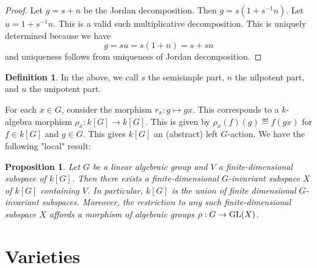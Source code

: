\documentclass[]{pcmi}
\theoremstyle{plain}
\newtheorem{Proposition}[equation]{Proposition}
\theoremstyle{definition}
\newtheorem{Definition}[equation]{Definition}
\begin{document}
\begin{proof}
    Let $g = s + n$ be the Jordan decomposition. Then $g = s(1 + s^{-1}n)$. Let $u = 1 + s^{-1}n$. This is a valid such multiplicative decomposition. This is uniquely determined because we have 
    \[
        g = su = s(1 + n) = s + sn
    \]
    and uniqueness follows from uniqueness of Jordan decomposition. 
\end{proof}

\begin{Definition}
    In the above, we call $s$ the semisimple part, $n$ the nilpotent part, and $u$ the unipotent part. 
\end{Definition}

For each $x \in G$, consider the morphism $r_x : g \mapsto gx$. This corresponds to a $k$-algebra morphism $\rho_x : k[G] \to k[G]$. This is given by $\rho_x(f)(g) \eqdef f(gx)$ for $f \in k[G]$ and $g \in G$. This gives $k[G]$ an (abstract) left $G$-action. We have the following "local" result: 

\begin{Proposition}
    Let $G$ be a linear algebraic group and $V$ a finite-dimensional subspace of $k[G]$. Then there exists a finite-dimensional $G$-invariant subspace $X$ of $k[G]$ containing $V$. In particular, $k[G]$ is the union of finite dimensional $G$-invariant subspaces. Moreover, the restriction to any such finite-dimensional subspace $X$ affords a morphism of algebraic groups $\rho : G \to \operatorname{GL}(X)$. 
\end{Proposition}
\appendix

\section{Varieties}
\end{document}
